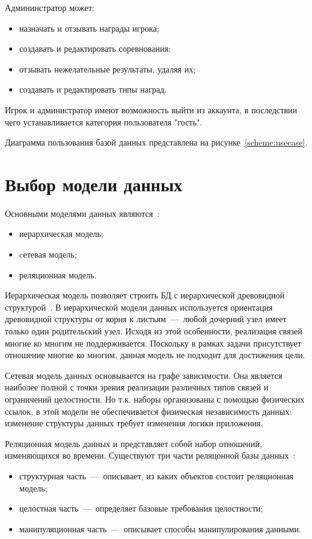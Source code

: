 Админинстратор может:
\begin{itemize}
	\item назначать и отзывать награды игрока;
	\item создавать и редактировать соревнования;
	\item отзывать нежелательные результаты, удаляя их;
	\item создавать и редактировать типы наград.
\end{itemize}

Игрок и администратор имеют возможность выйти из аккаунта, в последствии чего устанавливается категория пользователя "гость".

Диаграмма пользования базой данных представлена на рисунке~\ref{scheme:usecase}.


\section{Выбор модели данных}

Основными моделями данных являются~\cite{karpova}:
\begin{itemize}
	\item иерархическая модель;
	\item cетевая модель;
	\item реляционная модель.
\end{itemize}

Иерархическая модель позволяет строить БД с иерархической древовидной структурой~\cite{karpova}. В иерархической модели данных используется ориентация древовидной
структуры от корня к листьям~---~любой дочерний узел имеет только один родительский узел. Исходя из этой особенности, реализация связей многие ко многим не поддерживается.
Поскольку в рамках задачи присутствует отношение многие ко многим, данная модель не подходит для достижения цели.

Сетевая модель данных основывается на графе зависимости. Она является наиболее полной с точки зрения реализации различных типов связей и ограничений целостности. Но т.к. наборы организованы с помощью физических ссылок, в этой модели не обеспечивается физическая независимость данных: изменение структуры данных требует изменения логики приложения.~\cite{karpova}


Реляционная модель данных и представляет собой набор отношений, изменяющихся во времени. Существуют три части реляцонной базы данных~\cite{relationdb}:
\begin{itemize}
	\item структурная часть~---~описывает, из каких объектов состоит реляционная модель;
	\item целостная часть~---~определяет базовые требования целостности;
	\item манипуляционная часть~---~описывает способы манипулирования данными.
\end{itemize}

